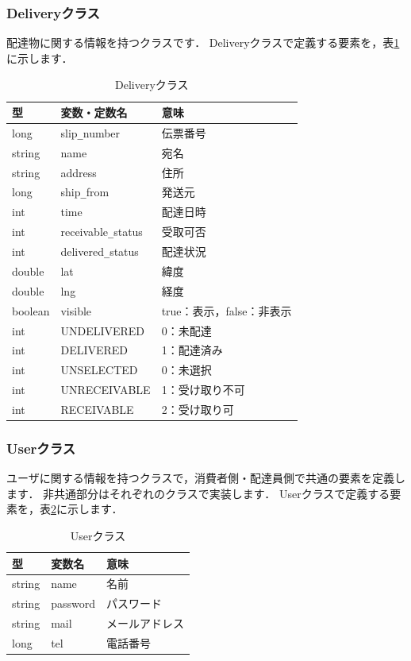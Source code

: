 \documentclass[a4j,titlepage]{jarticle}
\begin{document}
\subsubsection{Deliveryクラス}
配達物に関する情報を持つクラスです．
Deliveryクラスで定義する要素を，表\ref{deliveryTable}に示します．\\
\begin{table}[htb]
\centering
\caption{Deliveryクラス}
\label{deliveryTable}
\begin{tabular}{|lll|}
\hline
型 & 変数・定数名 & 意味      \\ \hline
long  &  slip\verb|_|number  &  伝票番号  \\
string  & name  & 宛名     \\
string & address &  住所    \\
long & ship\verb|_|from &  発送元    \\
int & time &  配達日時    \\
int & receivable\verb|_|status &  受取可否   \\
int & delivered\verb|_|status  &  配達状況  \\
double & lat & 緯度 \\
double & lng & 経度 \\
boolean & visible  &  true：表示，false：非表示    \\
int & UNDELIVERED  & 0：未配達   \\
int & DELIVERED  &  1：配達済み  \\
int & UNSELECTED  &  0：未選択  \\
int & UNRECEIVABLE  & 1：受け取り不可   \\
int & RECEIVABLE  & 2：受け取り可   \\\hline
\end{tabular}
\end{table}
\clearpage

\subsubsection{Userクラス}
ユーザに関する情報を持つクラスで，消費者側・配達員側で共通の要素を定義します．
非共通部分はそれぞれのクラスで実装します．
Userクラスで定義する要素を，表\ref{userTable}に示します．\\
\begin{table}[htb]
\centering
\caption{Userクラス}
\label{userTable}
\begin{tabular}{|lll|}
\hline
型 & 変数名 & 意味      \\ \hline
string  & name  & 名前     \\
string & password & パスワード     \\
string & mail & メールアドレス     \\
long & tel & 電話番号     \\\hline
\end{tabular}
\end{table}
\end{document}
